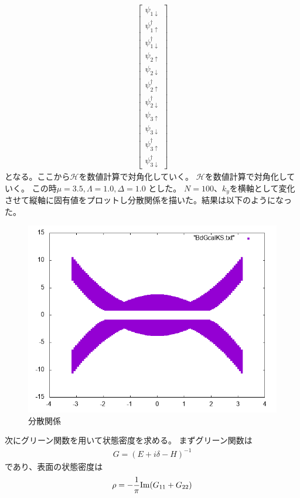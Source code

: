 \documentclass{jarticle}
\begin{document}
\begin{align}
\begin{bmatrix}
	\psi_{1\downarrow} \\ 
	\psi_{1\uparrow}^\dagger \\ 
	\psi_{1\downarrow}^\dagger \\ 
	\psi_{2\uparrow} \\ 
	\psi_{2\downarrow} \\ 
	\psi_{2\uparrow}^\dagger \\ 
	\psi_{2\downarrow}^\dagger \\ 
	\psi_{3\uparrow} \\ 
	\psi_{3\downarrow} \\ 
	\psi_{3\uparrow}^\dagger \\ 
	\psi_{3\downarrow}^\dagger
	\end{bmatrix} 
	\end{align}
	となる。ここから$\mathcal{H}$を数値計算で対角化していく。
$\mathcal{H}$を数値計算で対角化していく。	この時$\mu=3.5, \Lambda=1.0, \Delta=1.0$	とした。
$N=100$、$k_y$を横軸として変化させて縦軸に固有値をプロットし分散関係を描いた。結果は以下のようになった。\\		
\begin{figure}[H]
	\centering
	\includegraphics[scale=0.7]{BdGcalKSs.png}			%
	\caption{分散関係}
\end{figure}
次にグリーン関数を用いて状態密度を求める。
まずグリーン関数は
\begin{align}
G=(E+i\delta-H)^{-1}
\end{align}
であり、表面の状態密度は
\begin{align}
\rho=-\dfrac{1}{\pi}{\rm Im}(G_{11}+G_{22})
\end{align}
\end{document}
